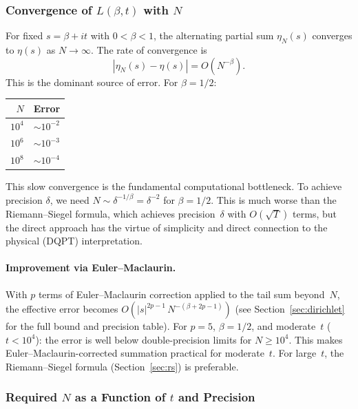 \subsubsection{Convergence of $L(\beta, t)$ with $N$}
\label{sec:conv-L}

For fixed $s = \beta + it$ with $0 < \beta < 1$, the alternating partial sum
$\eta_N(s)$ converges to $\eta(s)$ as $N \to \infty$. The rate of convergence is
\begin{equation}\label{eq:conv-rate}
  |\eta_N(s) - \eta(s)| = O(N^{-\beta}).
\end{equation}
This is the dominant source of error. For $\beta = 1/2$:
\begin{center}
\begin{tabular}{@{}rl@{}}
\toprule
$N$ & Error \\
\midrule
$10^4$ & $\sim 10^{-2}$ \\
$10^6$ & $\sim 10^{-3}$ \\
$10^8$ & $\sim 10^{-4}$ \\
\bottomrule
\end{tabular}
\end{center}
This slow convergence is the fundamental computational bottleneck. To achieve precision
$\delta$, we need $N \sim \delta^{-1/\beta} = \delta^{-2}$ for $\beta = 1/2$. This is
much worse than the Riemann--Siegel formula, which achieves precision~$\delta$ with
$O(\sqrt{T})$ terms, but the direct approach has the virtue of simplicity and direct
connection to the physical (DQPT) interpretation.

\paragraph{Improvement via Euler--Maclaurin.}
With $p$ terms of Euler--Maclaurin correction applied to the tail sum beyond~$N$, the
effective error becomes $O(|s|^{2p-1}\,N^{-(\beta+2p-1)})$ (see
Section~\ref{sec:dirichlet} for the full bound and precision table). For $p = 5$,
$\beta = 1/2$, and moderate~$t$ ($t < 10^4$): the error is well below double-precision
limits for $N \ge 10^4$. This makes Euler--Maclaurin-corrected summation practical for
moderate~$t$. For large~$t$, the Riemann--Siegel formula (Section~\ref{sec:rs}) is
preferable.

\subsubsection{Required $N$ as a Function of $t$ and Precision}
\label{sec:required-N}

